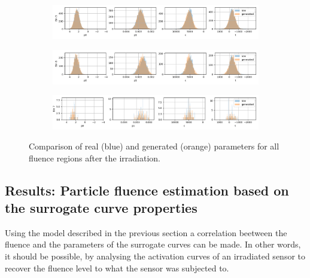 \begin{figure}[H]
\begin{subfigure}[b]{\textwidth}
  \end{subfigure}
\begin{subfigure}[b]{\textwidth}
    \centering
    \includegraphics[width=\linewidth]{figures/chapter4/surrogates/p3_histos_post_5.png}
  \end{subfigure}
\begin{subfigure}[b]{\textwidth}
    \centering
    \includegraphics[width=\linewidth]{figures/chapter4/surrogates/p3_histos_post_6.png}
  \end{subfigure}
\begin{subfigure}[b]{\textwidth}
    \centering
    \includegraphics[width=\linewidth]{figures/chapter4/surrogates/p3_histos_post_7.png}
  \end{subfigure}

  \caption[model post ir]{Comparison of real (blue) and generated (orange) parameters for all fluence regions after the irradiation.}
    \label{plot:model_s8_post}
\end{figure}


\subsection{Results: Particle fluence estimation based on the surrogate curve properties}

Using the model described in the previous section a correlation beetween the fluence and the parameters of the surrogate curves can be made. In other words, it should be possible, by analysing the activation curves of an irradiated sensor to recover the fluence level to what the sensor was subjected to. 

